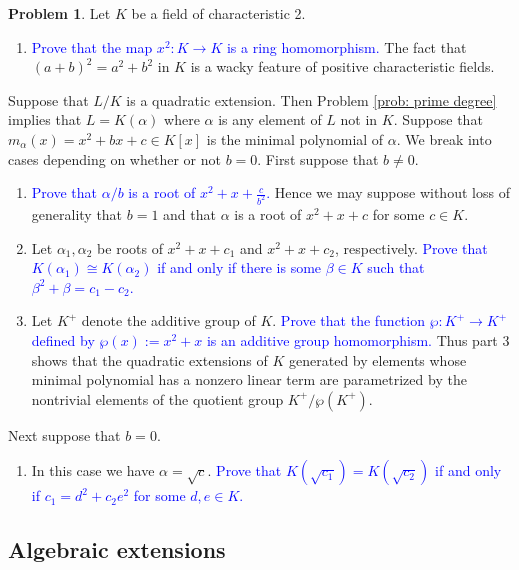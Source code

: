 \documentclass[11pt]{article}
\theoremstyle{definition}
\newtheorem{problem}{Problem}[section]
\numberwithin{equation}{subsection}
\newcommand{\blue}[1]{\textcolor{blue}{#1}}
\begin{document}
\begin{problem}
    Let $K$ be a field of characteristic 2.
    \begin{enumerate}
        \item \blue{Prove that the map $x^2 : K \to K$ is a ring homomorphism.}
        The fact that $(a + b)^2 = a^2 + b^2$ in $K$ is a wacky feature of positive characteristic fields.
    \end{enumerate}

    Suppose that $L/K$ is a quadratic extension.
    Then Problem \ref{prob: prime degree} implies that $L = K(\alpha)$ where $\alpha$ is any element of $L$ not in $K$.
    Suppose that $m_\alpha(x) = x^2 + bx + c \in K[x]$ is the minimal polynomial of $\alpha$.
    We break into cases depending on whether or not $b = 0$.
    First suppose that $b \neq 0$.
    
    \begin{enumerate}
        \item[2.] \blue{Prove that $\alpha/b$ is a root of $x^2 + x + \frac{c}{b^2}$.}
        Hence we may suppose without loss of generality that $b = 1$ and that $\alpha$ is a root of $x^2 + x + c$ for some $c \in K$.

        \item[3.] Let $\alpha_1, \alpha_2$ be roots of $x^2 + x + c_1$ and $x^2 + x + c_2$, respectively.
        \blue{Prove that $K(\alpha_1) \cong K(\alpha_2)$ if and only if there is some $\beta \in K$ such that $\beta^2 + \beta = c_1 - c_2$.}

        \item[4.] Let $K^+$ denote the additive group of $K$.
        \blue{Prove that the function $\wp : K^+ \to K^+$ defined by $\wp(x) := x^2 + x$ is an additive group homomorphism.}
        Thus part 3 shows that the quadratic extensions of $K$ generated by elements whose minimal polynomial has a nonzero linear term are parametrized by the nontrivial elements of the quotient group $K^+/\wp(K^+)$.
    \end{enumerate}

    Next suppose that $b = 0$.
    \begin{enumerate}
        \item[5.] In this case we have $\alpha = \sqrt{c}$.
        \blue{Prove that $K(\sqrt{c_1}) = K(\sqrt{c_2})$ if and only if $c_1 = d^2 + c_2e^2$ for some $d, e \in K$.}
    \end{enumerate}
\end{problem}

\subsection{Algebraic extensions}
\end{document}
